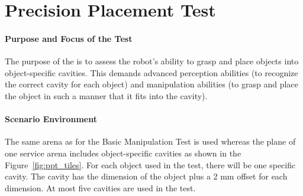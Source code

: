 \newpage
\section{Precision Placement Test}

\paragraph{Purpose and Focus of the Test}
The purpose of the  is to assess the robot's ability to grasp and place objects into object-specific cavities. This demands advanced perception abilities (to recognize the correct cavity for each object) and manipulation abilities (to grasp and place the object in such a manner that it fits into the cavity).

\paragraph{Scenario Environment}
The same arena as for the Basic Manipulation Test is used whereas the plane of one service arena includes object-specific cavities as shown in the Figure~\ref{fig:ppt_tiles}. For each object used in the test, there will be one specific cavity. The cavity has the dimension of the object plus a 2 mm offset for each dimension. At most five cavities are used in the test.


